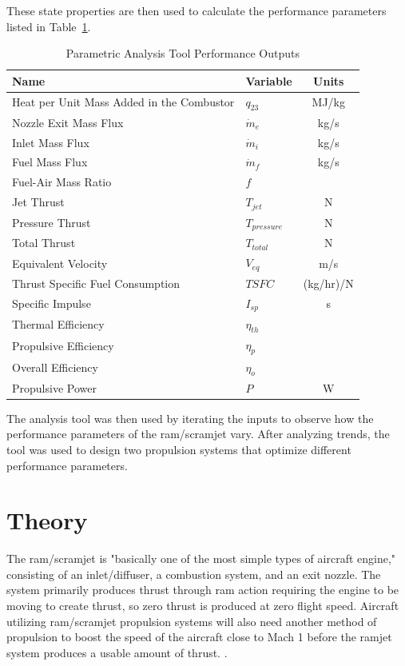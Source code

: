 \documentclass[conf]{new-aiaa} %
\begin{document}
These state properties are then used to calculate the performance parameters listed in Table~\ref{tab:perf_outputs}.

\begin{table}[H] %
    \caption{\label{tab:perf_outputs} Parametric Analysis Tool Performance Outputs}
    \centering
    \begin{tabular}{llc}
        \hline
        Name& Variable& Units\\\hline
        Heat per Unit Mass Added in the Combustor& $q_{23}$& MJ/kg\\
        Nozzle Exit Mass Flux& $\dot m_e$& kg/s\\
        Inlet Mass Flux& $\dot m_i$& kg/s\\
        Fuel Mass Flux& $\dot m_f$& kg/s\\
        Fuel-Air Mass Ratio& $f$\\
        Jet Thrust& $T_{jet}$& N\\
        Pressure Thrust& $T_{pressure}$& N\\
        Total Thrust& $T_{total}$& N\\
        Equivalent Velocity& $V_{eq}$& m/s\\
        Thrust Specific Fuel Consumption& $TSFC$& (kg/hr)/N\\
        Specific Impulse& $I_{sp}$& s\\
        Thermal Efficiency& $\eta_{th}$\\
        Propulsive Efficiency& $\eta_p$\\
        Overall Efficiency& $\eta_o$\\
        Propulsive Power& $P$& W\\
        \hline
    \end{tabular}
\end{table}

The analysis tool was then used by iterating the inputs to observe how the performance parameters of the ram/scramjet vary. After analyzing trends, the tool was used to design two propulsion systems that optimize different performance parameters.


\section{Theory} \label{sec:theory}
The ram/scramjet is "basically one of the most simple types of aircraft engine," consisting of an inlet/diffuser, a combustion system, and an exit nozzle. The system primarily produces thrust through ram action requiring the engine to be moving to create thrust, so zero thrust is produced at zero flight speed. Aircraft utilizing ram/scramjet propulsion systems will also need another method of propulsion to boost the speed of the aircraft close to Mach 1 before the ramjet system produces a usable amount of thrust. \cite{nasa1956ramjetperformance}.
\end{document}
